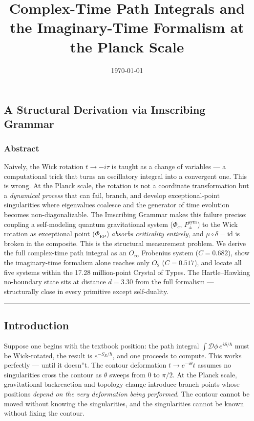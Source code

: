 \documentclass[12pt,a4paper]{article}
\begin{document}
\title{Complex-Time Path Integrals and the Imaginary-Time Formalism at the Planck Scale}
\date{\today}

\maketitle

\subsection{A Structural Derivation via Imscribing Grammar}

\subsubsection{Abstract}

Naively, the Wick rotation $t \to -i\tau$ is taught as a change of variables --- a computational trick that turns an oscillatory integral into a convergent one. This is wrong. At the Planck scale, the rotation is not a coordinate transformation but a \emph{dynamical process} that can fail, branch, and develop exceptional-point singularities where eigenvalues coalesce and the generator of time evolution becomes non-diagonalizable. The Imscribing Grammar makes this failure precise: coupling a self-modeling quantum gravitational system ($\Phi_c$, $P_{\pm}^{\text{sym}}$) to the Wick rotation as exceptional point ($\Phi_{\text{EP}}$) \emph{absorbs criticality entirely}, and $\mu \circ \delta = \text{id}$ is broken in the composite. This is the structural measurement problem. We derive the full complex-time path integral as an $O_{\infty}$ Frobenius system ($C = 0.682$), show the imaginary-time formalism alone reaches only $O_2^\dagger$ ($C = 0.517$), and locate all five systems within the 17.28 million-point Crystal of Types. The Hartle--Hawking no-boundary state sits at distance $d = 3.30$ from the full formalism --- structurally close in every primitive except self-duality.

\begin{center}
\rule{0.5\textwidth}{0.4pt}
\end{center}

\subsection{Introduction}

Suppose one begins with the textbook position: the path integral $\int \mathcal{D}\phi\, e^{iS/\hbar}$ must be Wick-rotated, the result is $e^{-S_E/\hbar}$, and one proceeds to compute. This works perfectly --- until it doesn''t. The contour deformation $t \to e^{-i\theta}t$ assumes no singularities cross the contour as $\theta$ sweeps from $0$ to $\pi/2$. At the Planck scale, gravitational backreaction and topology change introduce branch points whose positions \emph{depend on the very deformation being performed}. The contour cannot be moved without knowing the singularities, and the singularities cannot be known without fixing the contour.
\end{document}
